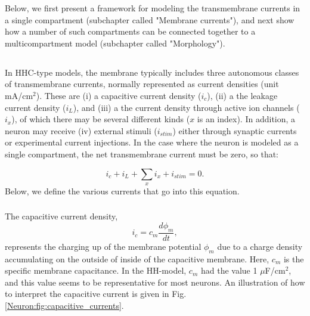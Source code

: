 Below, we first present a framework for modeling the transmembrane currents in a single compartment (subchapter called "Membrane currents"), and next show how a number of such compartments can be connected together to a multicompartment model (subchapter called "Morphology").


\subsection{}
In HHC-type models, the membrane typically includes three autonomous classes of transmembrane currents, normally represented as current densities (unit mA/cm$^2$). These are (i) a capacitive current density ($i_c$), (ii) a the leakage current density ($i_L$), and (iii) a the current density through active ion channels ($i_x$), of which there may be several different kinds ($x$ is an index). In addition, a neuron may receive  (iv) external stimuli ($i_{stim}$) either through synaptic currents or experimental current injections. In the case where the neuron is modeled as a single compartment, the net transmembrane current must be zero, so that:

\begin{equation}
i_c + i_L + \sum_x{i_x} +  i_{stim} = 0.
\label{eq:singlecomp_zerosum}
\end{equation}
Below, we define the various currents that go into this equation.

\subsubsection{}
The capacitive current density,
\begin{equation}
i_c = c_m \frac{d\phi_m}{dt},
\label{eq:HHcap}
\end{equation}
represents the charging up of the membrane potential $\phi_m$ due to a charge density accumulating on the outside of inside of the capacitive membrane. Here, $c_m$ is the specific membrane capacitance. In the HH-model, $c_m$ had the value
1 $\mu$F/cm$^2$, and this value seems to be representative for most neurons.  An illustration of how to interpret the capacitive current is given in Fig. \ref{Neuron:fig:capacitive_currents}. 

